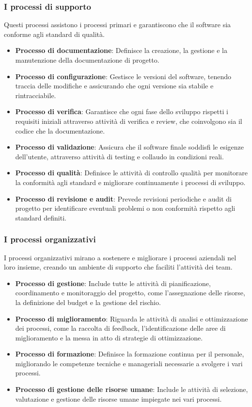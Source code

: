 \subsubsection{I processi di supporto}
Questi processi assistono i processi primari e garantiscono che il software sia conforme agli standard di qualità.
\begin{itemize}
    \item \textbf{Processo di documentazione}: Definisce la creazione, la gestione e la manutenzione della documentazione di progetto.
    \item \textbf{Processo di configurazione}: Gestisce le versioni del software, tenendo traccia delle modifiche e assicurando che ogni versione sia stabile e rintracciabile.
    \item \textbf{Processo di verifica}: Garantisce che ogni fase dello sviluppo rispetti i requisiti iniziali attraverso attività di verifica e review, che coinvolgono sia il codice che la documentazione.
    \item \textbf{Processo di validazione}: Assicura che il software finale soddisfi le esigenze dell'utente, attraverso attività di testing e collaudo in condizioni reali.
    \item \textbf{Processo di qualità}: Definisce le attività di controllo qualità per monitorare la conformità agli standard e migliorare continuamente i processi di sviluppo.
    \item \textbf{Processo di revisione e audit}: Prevede revisioni periodiche e audit di progetto per identificare eventuali problemi o non conformità rispetto agli standard definiti.
\end{itemize}

\subsubsection{I processi organizzativi}
I processi organizzativi mirano a sostenere e migliorare i processi aziendali nel loro insieme, creando un ambiente di supporto che faciliti l'attività dei team.
\begin{itemize}
    \item \textbf{Processo di gestione}: Include tutte le attività di pianificazione, coordinamento e monitoraggio del progetto, come l'assegnazione delle risorse, la definizione del budget e la gestione del rischio.
    \item \textbf{Processo di miglioramento}: Riguarda le attività di analisi e ottimizzazione dei processi, come la raccolta di feedback, l'identificazione delle aree di miglioramento e la messa in atto di strategie di ottimizzazione.
    \item \textbf{Processo di formazione}: Definisce la formazione continua per il personale, migliorando le competenze tecniche e manageriali necessarie a svolgere i vari processi.
    \item \textbf{Processo di gestione delle risorse umane}: Include le attività di selezione, valutazione e gestione delle risorse umane impiegate nei vari processi.
\end{itemize}

